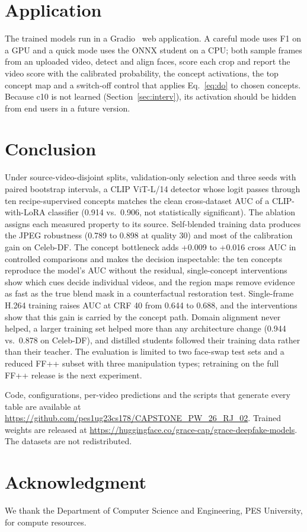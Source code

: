 \documentclass[conference]{IEEEtran}
\begin{document}
\section{Application}\label{sec:app}
The trained models run in a Gradio~\cite{gradio} web application. A careful mode uses F1 on a GPU and a quick mode
uses the ONNX student on a CPU; both sample frames from an uploaded video, detect and align faces, score each crop
and report the video score with the calibrated probability, the concept activations, the top concept map and a
switch-off control that applies Eq.~\eqref{eq:do} to chosen concepts. Because c10 is not learned
(Section~\ref{sec:interv}), its activation should be hidden from end users in a future version.

\section{Conclusion}\label{sec:conclusion}
Under source-video-disjoint splits, validation-only selection and three seeds with paired bootstrap intervals, a
CLIP ViT-L/14 detector whose logit passes through ten recipe-supervised concepts matches the clean cross-dataset AUC
of a CLIP-with-LoRA classifier (0.914 vs.\ 0.906, not statistically significant). The ablation assigns each
measured property to its source. Self-blended training data produces the JPEG robustness (0.789 to 0.898 at
quality 30) and most of the calibration gain on Celeb-DF. The concept bottleneck adds +0.009 to +0.016 cross AUC in
controlled comparisons and makes the decision inspectable: the ten concepts reproduce the model's AUC without the
residual, single-concept interventions show which cues decide individual videos, and the region maps remove
evidence as fast as the true blend mask in a counterfactual restoration test. Single-frame H.264 training raises AUC
at CRF 40 from 0.644 to 0.688, and the interventions show that this gain is carried by the concept path. Domain
alignment never helped, a larger training set helped more than any architecture change (0.944 vs.\ 0.878 on
Celeb-DF), and distilled students followed their training data rather than their teacher. The evaluation is limited to two face-swap test sets and a
reduced FF++ subset with three manipulation types; retraining on the full FF++ release is the next experiment.

Code, configurations, per-video predictions and the scripts that generate every table are available at
\url{https://github.com/pes1ug23cs178/CAPSTONE_PW_26_RJ_02}. Trained weights are released at
\url{https://huggingface.co/grace-cap/grace-deepfake-models}. The datasets are not redistributed.

\section*{Acknowledgment}
We thank the Department of Computer Science and Engineering, PES University, for compute resources.


\end{document}
